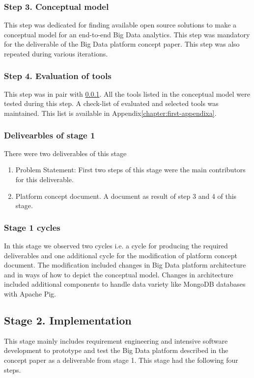 \subsubsection{Step 3. Conceptual model}\label{cmodel}
This step was dedicated for finding available open source solutions to make a conceptual model for an end-to-end Big Data analytics. This step was mandatory for the deliverable of the Big Data platform concept paper. This step was also repeated during various iterations.

\subsubsection{Step 4. Evaluation of tools}
This step was in pair with \ref{cmodel}. All the tools listed in the conceptual model were tested during this step. A check-list of evaluated and selected tools was maintained. This list is available in Appendix\ref{chapter:first-appendixa}.

\subsubsection{Delivearbles of stage 1}
There were two deliverables of this stage
\begin{enumerate}
\item Problem Statement: First two steps of this stage were the main contributors for this deliverable.
\item Platform concept document. A document as result of step 3 and 4 of this stage. 
\end{enumerate}

\subsubsection{Stage 1 cycles}
In this stage we observed two cycles i.e. a cycle for producing the required deliverables and one additional cycle for the modification of platform concept document. The modification included changes in Big Data platform architecture and in ways of how to depict the conceptual model. Changes in architecture included additional components to handle data variety like MongoDB databases with Apache Pig. 

\subsection{Stage 2. Implementation}\label{implement}
This stage mainly includes requirement engineering and intensive software development to prototype and test the Big Data platform described in the concept paper as a deliverable from stage 1. This stage had the following four steps.
